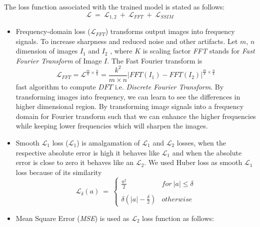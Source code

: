 The loss function associated with the trained model is stated as follows:
\begin{equation}
\mathcal{L} \ = \ \mathcal{L}_{{1, 2}} \ + \ \mathcal{L}_{FFT} \ + \ \mathcal{L}_{SSIM}
    \label{eqn:total_loss}
\end{equation}
\begin{itemize}
    \item Frequency-domain loss \cite{fft} ($\mathcal{L}_{FFT}$) transforms output images into frequency signals. To increase sharpness and
reduced noise and other artifacts. Let $m$, $n$ dimension of images $I_1$ and $I_2$ , where $K$ is
scaling factor
\textit{FFT} stands for \textit{Fast Fourier Transform} of Image $I$. The Fast Fourier transform is
\begin{equation}
    \mathcal{L}_{FFT} = \mathcal{L}^{\frac{m}{k}\times\frac{n}{k}} =  \frac{k^2}{m \times n} \left | FFT(I_1) - FFT(I_2) \right |^{\frac{m}{k}\times\frac{n}{k}}
    \label{eqn:fft}
\end{equation}
fast algorithm to compute $DFT$ i.e. \textit{Discrete Fourier Transform}. By transforming
images into frequency, we can learn to see the differences in higher dimensional region.
By transforming image signals into a frequency domain for Fourier transform such
that we can enhance the higher frequencies while keeping lower frequencies which will
sharpen the images. 
    \item Smooth $\mathcal{L}_{1}$ loss ($\mathcal{L}_{1}$) is amalgamation of $\mathcal{L}_{1}$ and $\mathcal{L}_{2}$ losses, when the respective 
absolute error is high it behaves like $\mathcal{L}_{1}$ and when the absolute error is close to zero it
behaves like an $\mathcal{L}_{2}$. We used Huber loss \cite{huber} as smooth $\mathcal{L}_{1}$ loss because of its similarity
\begin{equation}
    \mathcal{L}_{\delta}\left ( {a} \right ) \ = \ \left\{\begin{matrix}
{\frac{a^2}{2}} & for \ \left | a \right | \leq  \delta \\ \\
\delta \left ( \left | a \right |- \frac{\delta}{2} \right ) &  otherwise
\end{matrix}\right.
    \label{eqn:l1_loss}
\end{equation}
    \item Mean Square Error (\textit{MSE}) is used as $\mathcal{L}_{2}$ loss function as follows: \\
    

\end{itemize}
